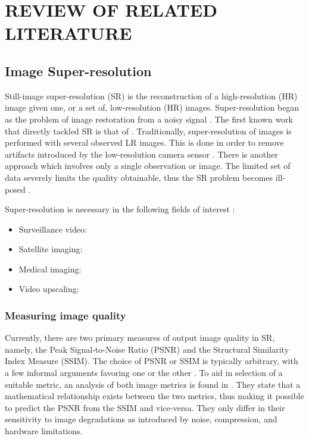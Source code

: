 
\chapter{REVIEW OF RELATED LITERATURE} %

\label{Chapter2} %



\section{Image Super-resolution}

Still-image super-resolution (SR) is the reconstruction of a high-resolution (HR) image given one, or a set of, low-resolution (HR) images. 
Super-resolution began as the problem of image restoration from a noisy signal \citep{Helstrom1967}.
The first known work that directly tackled SR is that of \cite{tsai1984multiframe}. 
Traditionally, super-resolution of images is performed with several observed LR images. This is done in order to remove artifacts introduced by the low-resolution camera sensor \citep{Yang2010a}. 
There is another approach which involves only a single observation or image.
The limited set of data severely limits the quality obtainable, thus 
the SR problem becomes ill-posed \citep{Yang2010a}.

Super-resolution is necessary in the following fields of interest \citep{Yang2010a}:
\begin{itemize}
	\item Surveillance video: 
	\item Satellite imaging:
	\item Medical imaging:
	\item Video upscaling:	
\end{itemize}

\subsection{Measuring image quality}
Currently, there are two primary measures of output image quality in SR, namely, the Peak Signal-to-Noise Ratio (PSNR) and the Structural Similarity Index Measure (SSIM). 
The choice of PSNR or SSIM is typically arbitrary, with a few informal arguments favoring one or the other \citep{Farsiu2004}.
To aid in selection of a suitable metric, an analysis of both image metrics is found in \cite{Hore2010}. 
They state that a mathematical relationship exists between the two metrics, thus making it possible to predict the PSNR from the SSIM and vice-versa. 
They only differ in their sensitivity to image degradations as introduced by noise, compression, and hardware limitations.


